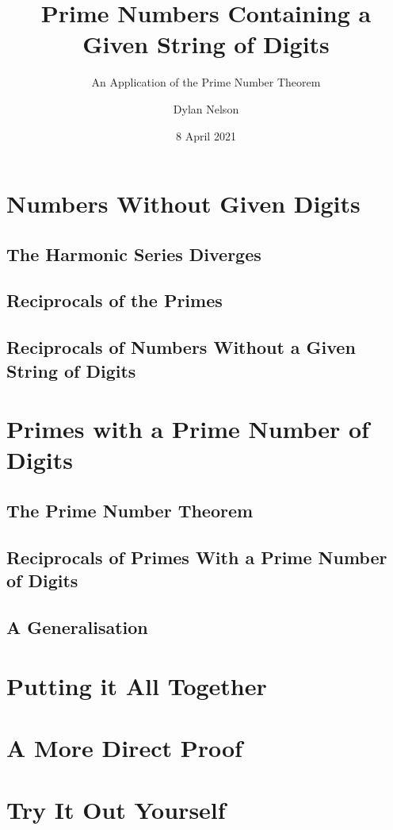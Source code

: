 \documentclass{beamer}
\title[Prime Strings]{Prime Numbers Containing a Given String of Digits}
\subtitle{An Application of the Prime Number Theorem}
\author{Dylan Nelson}
\institute[SUMS]{Stellenbosch University Mathematics Society}
\date{8 April 2021}
\begin{document}
\frame{\titlepage}

\section{Numbers Without Given Digits}
\subsection{The Harmonic Series Diverges}
\subsection{Reciprocals of the Primes}
\subsection{Reciprocals of Numbers Without a Given String of Digits}

\section{Primes with a Prime Number of Digits}
\subsection{The Prime Number Theorem}
\subsection{Reciprocals of Primes With a Prime Number of Digits}
\subsection{A Generalisation}

\section{Putting it All Together}

\section{A More Direct Proof}

\section{Try It Out Yourself}
\end{document}
